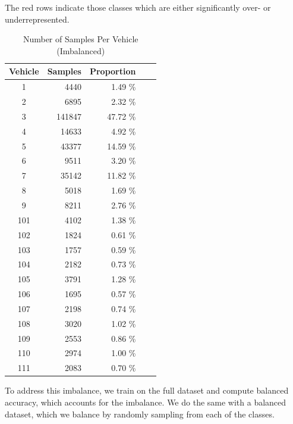 \documentclass[10pt]{article}
\newcommand{\newpar}{\medskip \noindent}
\begin{document}
\newpar The red rows indicate those classes which are either significantly over- or underrepresented.

\begin{table}
    \caption*{Number of Samples Per Vehicle (Imbalanced)}
    \centering
    \begin{tabular}{|c|r|r|r|r|}
    \hline
    \textbf{Vehicle} & \textbf{Samples} & \textbf{Proportion} \\
    \hline
    \rowcolor{red}
    1   & 4440   & 1.49  \% \\
    \rowcolor{red}
    2   & 6895   & 2.32  \% \\
    \rowcolor{red}
    3   & 141847 & 47.72 \% \\
    4   & 14633  & 4.92  \% \\
    \rowcolor{red}
    5   & 43377  & 14.59 \% \\
    6   & 9511   & 3.20  \% \\
    \rowcolor{red}
    7   & 35142  & 11.82 \% \\
    \rowcolor{red}
    8   & 5018   & 1.69  \% \\
    9   & 8211   & 2.76  \% \\
    \rowcolor{red}
    101 & 4102   & 1.38  \% \\
    \rowcolor{red}
    102 & 1824   & 0.61  \% \\
    \rowcolor{red}
    103 & 1757   & 0.59  \% \\
    \rowcolor{red}
    104 & 2182   & 0.73  \% \\
    \rowcolor{red}
    105 & 3791   & 1.28  \% \\
    \rowcolor{red}
    106 & 1695   & 0.57  \% \\
    \rowcolor{red}
    107 & 2198   & 0.74  \% \\
    \rowcolor{red}
    108 & 3020   & 1.02  \% \\
    \rowcolor{red}
    109 & 2553   & 0.86  \% \\
    \rowcolor{red}
    110 & 2974   & 1.00  \% \\
    \rowcolor{red}
    111 & 2083   & 0.70  \% \\
    \hline
    \end{tabular}
\end{table}

\newpar To address this imbalance, we train on the full dataset and compute balanced accuracy, which accounts for the imbalance. We do the same with a balanced dataset, which we balance by randomly sampling from each of the classes.
\end{document}
